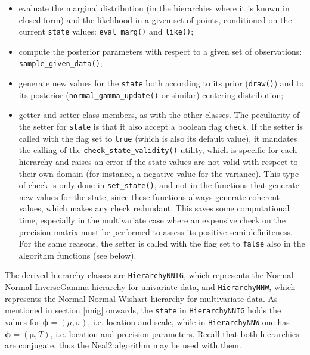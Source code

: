 \begin{itemize}
	\item evaluate the marginal distribution (in the hierarchies where it is known in closed form) and the likelihood in a given set of points, conditioned on the current \verb|state| values: \verb|eval_marg()| and \verb|like()|;
	\item compute the posterior parameters with respect to a given set of observations: \verb|sample_given_data()|;
	\item generate new values for the \verb|state| both according to its prior (\verb|draw()|) and to its posterior (\verb|normal_gamma_update()| or similar) centering distribution;
	\item getter and setter class members, as with the other classes.
	The peculiarity of the setter for \verb|state| is that it also accept a boolean flag \verb|check|.
	If the setter is called with the flag set to \verb|true| (which is also its default value), it mandates the calling of the \verb|check_state_validity()| utility, which is specific for each hierarchy and raises an error if the state values are not valid with respect to their own domain (for instance, a negative value for the variance).
	This type of check is only done in \verb|set_state()|, and not in the functions that generate new values for the state, since these functions always generate coherent values, which makes any check redundant.
	This saves some computational time, especially in the multivariate case where an expensive check on the precision matrix must be performed to assess its positive semi-definiteness.
	For the same reasons, the setter is called with the flag set to \verb|false| also in the algorithm functions (see below).
\end{itemize}
The derived hierarchy classes are \verb|HierarchyNNIG|, which represents the Normal Normal-InverseGamma hierarchy for univariate data, and \verb|HierarchyNNW|, which represents the Normal Normal-Wishart hierarchy for multivariate data.
As mentioned in section \ref{nnig} onwards, the \verb|state| in \verb|HierarchyNNIG| holds the values for $\boldsymbol\phi = (\mu,\sigma)$, i.e.  location and scale, while in \verb|HierarchyNNW| one has $\boldsymbol\phi = (\boldsymbol\mu,T)$, i.e. location and precision parameters.
Recall that both hierarchies are conjugate, thus the Neal2 algorithm may be used with them.


